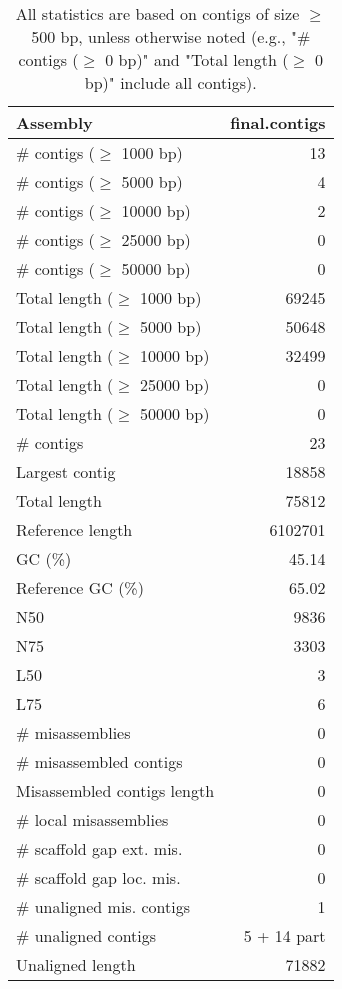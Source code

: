 \documentclass[12pt,a4paper]{article}
\begin{document}
\begin{table}[ht]
\begin{center}
\caption{All statistics are based on contigs of size $\geq$ 500 bp, unless otherwise noted (e.g., "\# contigs ($\geq$ 0 bp)" and "Total length ($\geq$ 0 bp)" include all contigs).}
\begin{tabular}{|l*{1}{|r}|}
\hline
Assembly & final.contigs \\ \hline
\# contigs ($\geq$ 1000 bp) & 13 \\ \hline
\# contigs ($\geq$ 5000 bp) & 4 \\ \hline
\# contigs ($\geq$ 10000 bp) & 2 \\ \hline
\# contigs ($\geq$ 25000 bp) & 0 \\ \hline
\# contigs ($\geq$ 50000 bp) & 0 \\ \hline
Total length ($\geq$ 1000 bp) & 69245 \\ \hline
Total length ($\geq$ 5000 bp) & 50648 \\ \hline
Total length ($\geq$ 10000 bp) & 32499 \\ \hline
Total length ($\geq$ 25000 bp) & 0 \\ \hline
Total length ($\geq$ 50000 bp) & 0 \\ \hline
\# contigs & 23 \\ \hline
Largest contig & 18858 \\ \hline
Total length & 75812 \\ \hline
Reference length & 6102701 \\ \hline
GC (\%) & 45.14 \\ \hline
Reference GC (\%) & 65.02 \\ \hline
N50 & 9836 \\ \hline
N75 & 3303 \\ \hline
L50 & 3 \\ \hline
L75 & 6 \\ \hline
\# misassemblies & 0 \\ \hline
\# misassembled contigs & 0 \\ \hline
Misassembled contigs length & 0 \\ \hline
\# local misassemblies & 0 \\ \hline
\# scaffold gap ext. mis. & 0 \\ \hline
\# scaffold gap loc. mis. & 0 \\ \hline
\# unaligned mis. contigs & 1 \\ \hline
\# unaligned contigs & 5 + 14 part \\ \hline
Unaligned length & 71882 \\ \hline

\end{tabular}
\end{center}
\end{table}
\end{document}
